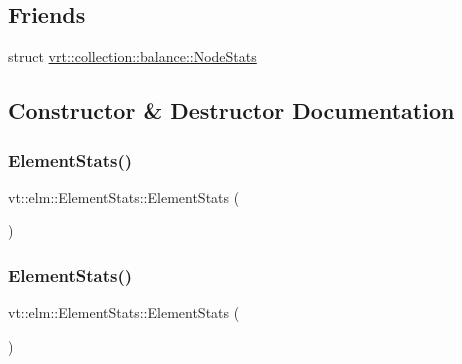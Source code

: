 \subsection*{Friends}
\begin{DoxyCompactItemize}
\item 
struct \hyperlink{structvt_1_1elm_1_1_element_stats_a72c04e9376268c6f0ce31510c372fe50}{vrt\+::collection\+::balance\+::\+Node\+Stats}
\end{DoxyCompactItemize}


\subsection{Constructor \& Destructor Documentation}
\mbox{\label{structvt_1_1elm_1_1_element_stats_a9a07ef20788a8b9f4f0b8633352cb931}} 
\subsubsection{\texorpdfstring{Element\+Stats()}{ElementStats()}\hspace{0.1cm}{\footnotesize\ttfamily [1/3]}}
{\footnotesize\ttfamily vt\+::elm\+::\+Element\+Stats\+::\+Element\+Stats (\begin{DoxyParamCaption}{ }\end{DoxyParamCaption})\hspace{0.3cm}{\ttfamily [default]}}

\mbox{\label{structvt_1_1elm_1_1_element_stats_afa1b9b94a8d93abc67c8be727f1fab44}} 
\subsubsection{\texorpdfstring{Element\+Stats()}{ElementStats()}\hspace{0.1cm}{\footnotesize\ttfamily [2/3]}}
{\footnotesize\ttfamily vt\+::elm\+::\+Element\+Stats\+::\+Element\+Stats (\begin{DoxyParamCaption}\item[{\hyperlink{structvt_1_1elm_1_1_element_stats}{Element\+Stats} const \&}]{ }\end{DoxyParamCaption})\hspace{0.3cm}{\ttfamily [default]}}

